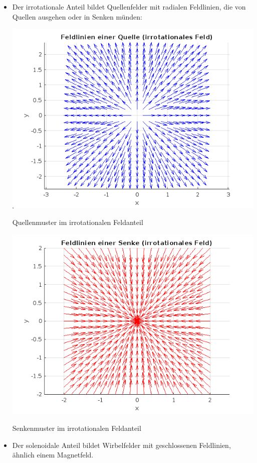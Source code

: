 \begin{itemize}
\item Der irrotationale Anteil bildet Quellenfelder mit radialen Feldlinien, die von Quellen ausgehen oder in Senken münden:
 
\begin{table}[h]
\centering
\includegraphics[scale=0.3]{papers/helmholtz/images/Quelle.png}
\caption{Quellenmuster im irrotationalen Feldanteil}
\label{fig:quelle}
\end{table}
 
\begin{table}[h]
\centering
\includegraphics[scale=0.3]{papers/helmholtz/images/Senke.png}
\caption{Senkenmuster im irrotationalen Feldanteil}
\label{fig:senke}
\end{table}
 
\item Der solenoidale Anteil bildet Wirbelfelder mit geschlossenen Feldlinien, ähnlich einem Magnetfeld.
\end{itemize}
  
